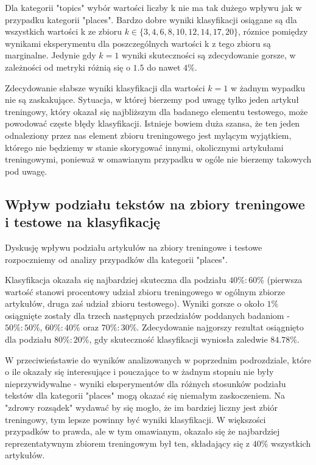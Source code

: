 \documentclass{classrep}
\begin{document}
Dla kategorii "topics" wybór wartości liczby k nie ma tak dużego wpływu jak w przypadku kategorii "places". Bardzo dobre wyniki klasyfikacji osiągane są dla wszystkich wartości k ze zbioru $k \in \{3, 4, 6, 8, 10, 12, 14, 17, 20\}$, róznice pomiędzy wynikami eksperymentu dla poszczególnych wartości k z tego zbioru są marginalne. Jedynie gdy $k=1$ wyniki skuteczności są zdecydowanie gorsze, w zależności od metryki różnią się o $1.5$ do nawet $4\%$. \newline

Zdecydowanie słabsze wyniki klasyfikacji dla wartości $k=1$ w żadnym wypadku nie są zaskakujące. Sytuacja, w której bierzemy pod uwagę tylko jeden artykuł treningowy, który okazał się najbliższym dla badanego elementu testowego, może powodować częste błędy klasyfikacji. Istnieje bowiem duża szansa, że ten jeden odnaleziony przez nas element zbioru treningowego jest mylącym wyjątkiem, którego nie będziemy w stanie skorygować innymi, okolicznymi artykułami treningowymi, ponieważ w omawianym przypadku w ogóle nie bierzemy takowych pod uwagę.

\subsection{Wpływ podziału tekstów na zbiory treningowe i testowe na klasyfikację}
Dyskusję wpływu podziału artykułów na zbiory treningowe i testowe rozpoczniemy od analizy przypadków dla kategorii "places".  \newline

Klasyfikacja okazała się najbardziej skuteczna dla podziału $40\%:60\%$ (pierwsza wartość stanowi procentowy udział zbioru treningowego w ogólnym zbiorze artykułów, druga zaś udział zbioru testowego). Wyniki gorsze o około $1\%$ osiągnięte zostały dla trzech następnych przedziałów poddanych badaniom - $50\%:50\%$, $60\%:40\%$ oraz $70\%:30\%$. Zdecydowanie najgorszy rezultat osiągnięto dla podziału $80\%:20\%$, gdy skuteczność klasyfikacji wyniosła zaledwie $84.78\%$.\newline

W przeciwieństawie do wyników analizowanych w poprzednim podrozdziale, które o ile okazały się interesujące i pouczające to w żadnym stopniu nie były nieprzywidywalne - wyniki eksperymentów dla różnych stosunków podziału tekstów dla kategorii "places" mogą okazać się niemałym zaskoczeniem. Na "zdrowy rozsądek" wydawać by się mogło, że im bardziej liczny jest zbiór treningowy, tym lepsze powinny być wyniki klasyfikacji. W większości przypadków to prawda, ale w tym omawianym, okazało się że najbardziej reprezentatywnym zbiorem treningowym był ten, składający się z $40\%$ wszystkich artykułów.\newline
\end{document}
